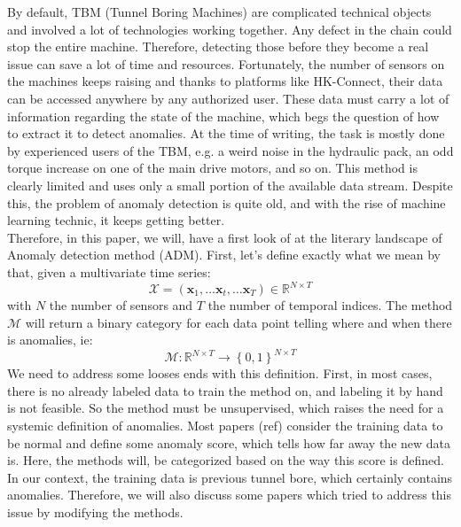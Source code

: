 \documentclass[../../main/main.tex]{subfiles}
\begin{document}

    By default, TBM (Tunnel Boring Machines) are complicated technical objects and involved  a lot of technologies working together. Any defect in the chain
    could stop the entire machine. Therefore, detecting those before they become a real issue can save a lot of time and resources. Fortunately, the number
    of sensors on the machines keeps raising  and thanks to platforms like HK-Connect, their data can be accessed anywhere by any authorized user. These data
    must carry a lot of information regarding the state of the machine, which begs the question of how to extract it to detect anomalies. At the time of writing,
    the task is mostly done by experienced users of the TBM, e.g. a weird noise in the hydraulic pack, an odd torque increase on one of the main drive motors,
    and so on. This method is clearly limited and uses only a small portion of the available data stream. Despite this, the problem of anomaly detection is quite
    old, and with the rise of machine learning technic, it keeps getting better. \\
    Therefore, in this paper, we will, have a first look of at the literary landscape of Anomaly detection method (ADM). First, let's define exactly what we mean by that, given a multivariate time series: 
    \[\mathcal{X} = (\textbf{x}_1, \dots \textbf{x}_t, \dots \textbf{x}_T) \in \mathbb{R}^{N \times T}\]
    with $N$ the number of sensors and $T$ the number of temporal indices. The method $\mathcal{M} $ will return a binary category for each data point 
    telling where and when there is anomalies, ie:
    \[\mathcal{M} : \mathbb{R}^{N \times T} \to \left\{0, 1\right\} ^{N \times T}\]
    We need to address some looses ends with this definition. First, in most cases, there is no already labeled data to train the method on, and labeling it
    by hand is not feasible. So the method must be unsupervised, which raises the need for a systemic definition of anomalies. Most papers (ref) consider the
    training data to be normal and define some anomaly score, which tells how far away the new data is. Here, the methods will, be categorized based on the way
    this score is defined.\\
    In our context, the training data is previous tunnel bore, which certainly contains anomalies. Therefore, we will also discuss some papers which tried to
    address this issue by modifying the methods. 
\end{document}
